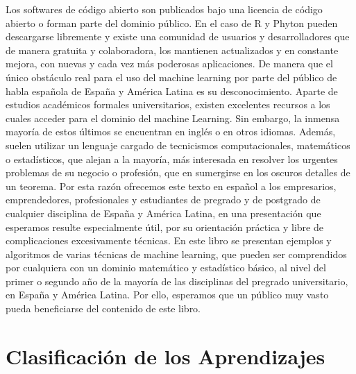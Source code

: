\documentclass[12pt,]{krantz}
\begin{document}
Los softwares de código abierto son publicados bajo una licencia de código abierto o forman parte del dominio público. En el caso de R y Phyton pueden descargarse libremente y existe una comunidad de usuarios y desarrolladores que de manera gratuita y colaboradora, los mantienen actualizados y en constante mejora, con nuevas y cada vez más poderosas aplicaciones. De manera que el único obstáculo real para el uso del machine learning por parte del público de habla española de España y América Latina es su desconocimiento.
Aparte de estudios académicos formales universitarios, existen excelentes recursos a los cuales acceder para el dominio del machine Learning. Sin embargo, la inmensa mayoría de estos últimos se encuentran en inglés o en otros idiomas. Además, suelen utilizar un lenguaje cargado de tecnicismos computacionales, matemáticos o estadísticos, que alejan a la mayoría, más interesada en resolver los urgentes problemas de su negocio o profesión, que en sumergirse en los oscuros detalles de un teorema. Por esta razón ofrecemos este texto en español a los empresarios, emprendedores, profesionales y estudiantes de pregrado y de postgrado de cualquier disciplina de España y América Latina, en una presentación que esperamos resulte especialmente útil, por su orientación práctica y libre de complicaciones excesivamente técnicas.
En este libro se presentan ejemplos y algoritmos de varias técnicas de machine learning, que pueden ser comprendidos por cualquiera con un dominio matemático y estadístico básico, al nivel del primer o segundo año de la mayoría de las disciplinas del pregrado universitario, en España y América Latina. Por ello, esperamos que un público muy vasto pueda beneficiarse del contenido de este libro.

\hypertarget{clasificacion-de-los-aprendizajes}{%
\section{Clasificación de los Aprendizajes}\label{clasificacion-de-los-aprendizajes}}
\end{document}
